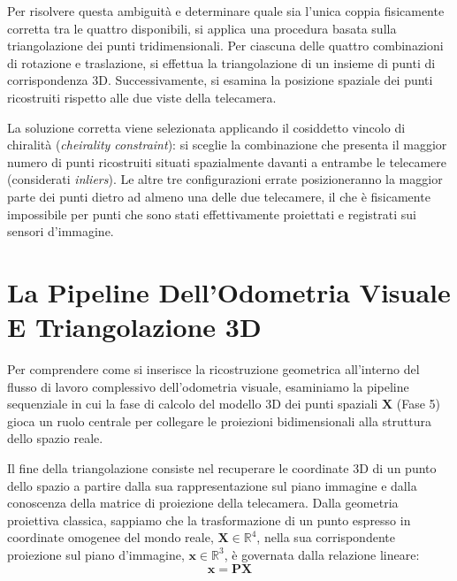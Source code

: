 ﻿\documentclass[11pt, a4paper]{article}
\begin{document}
Per risolvere questa ambiguità e determinare quale sia l'unica coppia fisicamente corretta tra le quattro disponibili, si applica una procedura basata sulla triangolazione dei punti tridimensionali. Per ciascuna delle quattro combinazioni di rotazione e traslazione, si effettua la triangolazione di un insieme di punti di corrispondenza 3D. Successivamente, si esamina la posizione spaziale dei punti ricostruiti rispetto alle due viste della telecamera.

La soluzione corretta viene selezionata applicando il cosiddetto vincolo di chiralità (\emph{cheirality constraint}): si sceglie la combinazione che presenta il maggior numero di punti ricostruiti situati spazialmente davanti a entrambe le telecamere (considerati \emph{inliers}). Le altre tre configurazioni errate posizioneranno la maggior parte dei punti dietro ad almeno una delle due telecamere, il che è fisicamente impossibile per punti che sono stati effettivamente proiettati e registrati sui sensori d'immagine.

\newpage

\section{La Pipeline Dell'Odometria Visuale E Triangolazione 3D}


Per comprendere come si inserisce la ricostruzione geometrica all'interno del flusso di lavoro complessivo dell'odometria visuale, esaminiamo la pipeline sequenziale in cui la fase di calcolo del modello 3D dei punti spaziali $\bm{X}$ (Fase 5) gioca un ruolo centrale per collegare le proiezioni bidimensionali alla struttura dello spazio reale.

Il fine della triangolazione consiste nel recuperare le coordinate 3D di un punto dello spazio a partire dalla sua rappresentazione sul piano immagine e dalla conoscenza della matrice di proiezione della telecamera. Dalla geometria proiettiva classica, sappiamo che la trasformazione di un punto espresso in coordinate omogenee del mondo reale, $\bm{X} \in \mathbb{R}^4$, nella sua corrispondente proiezione sul piano d'immagine, $\bm{x} \in \mathbb{R}^3$, è governata dalla relazione lineare:
\[ \bm{x} = \bm{P}\bm{X} \]
\end{document}
